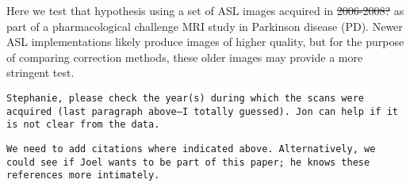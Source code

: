 Here we test that hypothesis using a set of ASL images acquired in \sout{2006-2008?} as part of a pharmacological challenge MRI study in Parkinson disease (PD).\cite{Black_2010} Newer ASL implementations likely produce images of higher quality, but for the purpose of comparing correction methods, these older images may provide a more stringent test.

\verb|Stephanie, please check the year(s) during which the scans were acquired (last paragraph above–I totally guessed). Jon can help if it is not clear from the data.|

\verb|We need to add citations where indicated above. Alternatively, we could see if Joel wants to be part of this paper; he knows these references more intimately.|